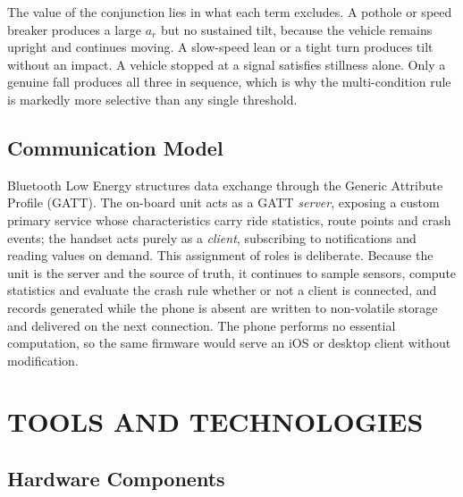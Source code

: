 \documentclass[12pt,a4paper,oneside]{report}
\begin{document}
The value of the conjunction lies in what each term excludes. A pothole or speed breaker
produces a large \(a_r\) but no sustained tilt, because the vehicle remains upright and
continues moving. A slow-speed lean or a tight turn produces tilt without an impact. A
vehicle stopped at a signal satisfies stillness alone. Only a genuine fall produces all
three in sequence, which is why the multi-condition rule is markedly more selective than any
single threshold.

\subsection{Communication Model}

Bluetooth Low Energy structures data exchange through the Generic Attribute Profile (GATT).
The on-board unit acts as a GATT \emph{server}, exposing a custom primary service whose
characteristics carry ride statistics, route points and crash events; the handset acts
purely as a \emph{client}, subscribing to notifications and reading values on demand. This
assignment of roles is deliberate. Because the unit is the server and the source of truth,
it continues to sample sensors, compute statistics and evaluate the crash rule whether or
not a client is connected, and records generated while the phone is absent are written to
non-volatile storage and delivered on the next connection. The phone performs no essential
computation, so the same firmware would serve an iOS or desktop client without
modification.

\section{TOOLS AND TECHNOLOGIES}

\subsection{Hardware Components}
\end{document}
